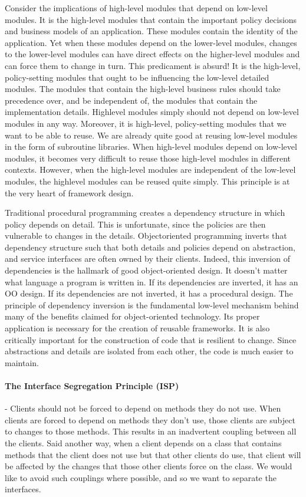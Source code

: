 \documentclass{llncs}
\begin{document}
Consider the implications of high-level modules that depend on low-level modules. 
It is the high-level modules that contain the important policy decisions and business models of an application. 
These modules contain the identity of the application. 
Yet when these modules depend on the lower-level modules, changes to the lower-level modules can have direct effects on the higher-level modules and can force them to change in turn.
This predicament is absurd! 
It is the high-level, policy-setting modules that ought to be influencing the low-level detailed modules.
The modules that contain the high-level business rules should take precedence over, and be independent of, the modules that contain the implementation details. 
Highlevel modules simply should not depend on low-level modules in any way.
Moreover, it is high-level, policy-setting modules that we want to be able to reuse.
We are already quite good at reusing low-level modules in the form of subroutine libraries.
When high-level modules depend on low-level modules, it becomes very difficult to reuse those high-level modules in different contexts. 
However, when the high-level modules are independent of the low-level modules, the highlevel modules can be reused quite simply. This principle is at the very heart of framework design.

Traditional procedural programming creates a dependency structure in which policy depends on detail.
This is unfortunate, since the policies are then vulnerable to changes in the details. 
Objectoriented programming inverts that dependency structure such that both details and policies depend on abstraction, and service interfaces are often owned by their clients.
Indeed, this inversion of dependencies is the hallmark of good object-oriented design. 
It doesn't matter what language a program is written in. 
If its dependencies are inverted, it has an OO design.
If its dependencies are not inverted, it has a procedural design.
The principle of dependency inversion is the fundamental low-level mechanism behind many of the benefits claimed for object-oriented technology.
Its proper application is necessary for the creation of reusable frameworks. 
It is also critically important for the construction of code that is resilient to change. 
Since abstractions and details are isolated from each other, the code is much easier to maintain.\cite{MartinASD}\cite{Dooley}

\paragraph{ The Interface Segregation Principle (ISP)} - Clients should not be forced to depend on methods they do not use.
When clients are forced to depend on methods they don't use, those clients are subject to changes to those methods.
This results in an inadvertent coupling between all the clients.
Said another way, when a client depends on a class that contains methods that the client does not use but that other clients do use, that client will be affected by the changes that those other clients force on the class.
We would like to avoid such couplings where possible, and so we want to separate the interfaces.
\end{document}

